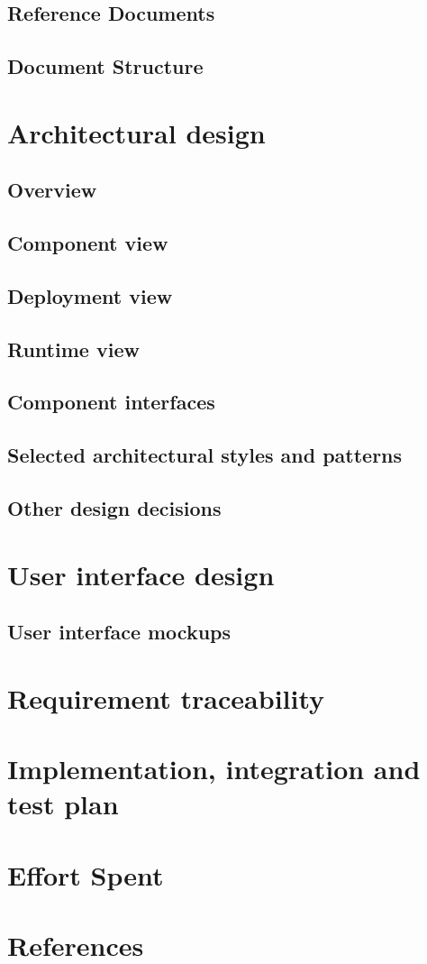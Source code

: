     \section{Reference Documents}
        
    \section{Document Structure}
    	
    
\newpage
\chapter{Architectural design}
    \section{Overview}
    	
    \section{Component view}
    	
    \section{Deployment view}
    	
    \section{Runtime view}
    \section{Component interfaces}
    \section{Selected architectural styles and patterns}
    	
    \section{Other design decisions}
\newpage
\chapter{User interface design}
	\section{User interface mockups}
		
\newpage
\chapter{Requirement traceability}
\chapter{Implementation, integration and test plan}
\chapter{Effort Spent}
    
\chapter{References}


